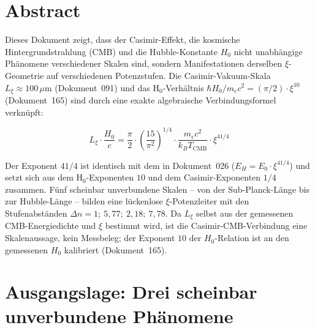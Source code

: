 
\section*{Abstract}

Dieses Dokument zeigt, dass der Casimir-Effekt, die kosmische Hintergrundstrahlung (CMB)
und die Hubble-Konstante $H_0$ nicht unabhängige Phänomene verschiedener Skalen sind,
sondern Manifestationen derselben $\xi$-Geometrie auf verschiedenen Potenzstufen.
Die Casimir-Vakuum-Skala $L_\xi \approx 100\,\mu\text{m}$ (Dokument~091) und das
H$_0$-Verhältnis $\hbar H_0 / m_e c^2 = (\pi/2)\cdot\xi^{10}$ (Dokument~165)
sind durch eine exakte algebraische Verbindungsformel verknüpft:

\begin{equation}
    \boxed{L_\xi \cdot \frac{H_0}{c}
    = \frac{\pi}{2}\cdot\left(\frac{15}{\pi^2}\right)^{\!1/4}
    \cdot \frac{m_e c^2}{k_B T_\text{CMB}} \cdot \xi^{41/4}}
    \label{eq:bridge_main}
\end{equation}

Der Exponent $41/4$ ist identisch mit dem in Dokument~026 ($E_H = E_0 \cdot \xi^{41/4}$)
und setzt sich aus dem H$_0$-Exponenten $10$ und dem Casimir-Exponenten $1/4$ zusammen.
Fünf scheinbar unverbundene Skalen -- von der Sub-Planck-Länge bis zur Hubble-Länge --
bilden eine lückenlose $\xi$-Potenzleiter mit den Stufenabständen $\Delta n = 1;\ 5{,}77;\ 2{,}18;\ 7{,}78$.
Da $L_\xi$ selbst aus der gemessenen CMB-Energiedichte und $\xi$ bestimmt wird, ist die
Casimir-CMB-Verbindung eine Skalenaussage, kein Messbeleg; der Exponent $10$ der
$H_0$-Relation ist an den gemessenen $H_0$ kalibriert (Dokument~165).

\clearpage

\section{Ausgangslage: Drei scheinbar unverbundene Phänomene}
\label{sec:ausgangslage}

